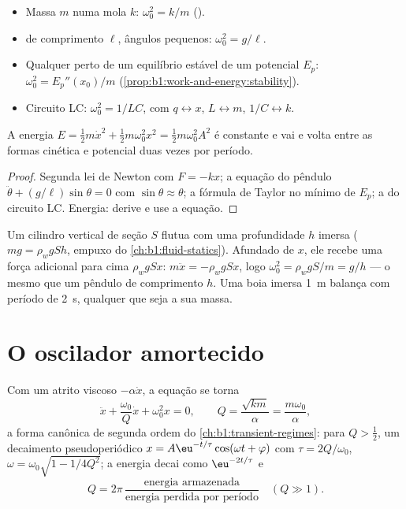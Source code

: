 \begin{proposition}\label{prop:b1:oscillators-resonance:sources}
\begin{itemize}
  \item Massa $m$ numa mola $k$: $\omega_0^2 = k/m$ ().
  \item {} de comprimento $\ell$, ângulos pequenos: $\omega_0^2 = g/\ell$.
  \item Qualquer  perto de um equilíbrio estável de um potencial $E_p$:
        $\omega_0^2 = E_p''(x_0)/m$ (\cref{prop:b1:work-and-energy:stability}).
  \item Circuito LC: $\omega_0^2 = 1/LC$, com $q \leftrightarrow x$,
        $L \leftrightarrow m$, $1/C \leftrightarrow k$.
\end{itemize}
A energia $E = \tfrac12 m\dot x^2 + \tfrac12 m\omega_0^2x^2 = \tfrac12
m\omega_0^2A^2$ é constante e vai e volta entre as formas cinética e
potencial duas vezes por período.
\end{proposition}

\begin{proof}
Segunda lei de Newton com $F = -kx$; a equação do pêndulo
$\ddot\theta + (g/\ell)\sin\theta = 0$ com $\sin\theta \approx \theta$;
a fórmula de Taylor no mínimo de $E_p$; a  do circuito
LC. Energia: derive e use a equação.
\end{proof}

\begin{example}\label{ex:b1:oscillators-resonance:bob}
Um cilindro vertical de seção $S$ flutua com uma profundidade $h$
imersa ($mg = \rho_wgSh$, empuxo do \cref{ch:b1:fluid-statics}).
Afundado de $x$, ele recebe uma força adicional para cima $\rho_wgSx$:
$m\ddot x = -\rho_wgSx$, logo $\omega_0^2 = \rho_wgS/m = g/h$ --- o mesmo
que um pêndulo de comprimento $h$. Uma boia imersa \qty{1}{m} balança com
período de \qty{2}{s}, qualquer que seja a sua massa.
\end{example}

\section{O oscilador amortecido}

\begin{proposition}\label{prop:b1:oscillators-resonance:damped}
Com um atrito viscoso $-\alpha\dot x$, a equação se torna
\[
\ddot x + \frac{\omega_0}{Q}\dot x + \omega_0^2x = 0, \qquad
Q = \frac{\sqrt{km}}{\alpha} = \frac{m\omega_0}{\alpha},
\]
a forma canônica de segunda ordem do \cref{ch:b1:transient-regimes}: para
$Q > \tfrac12$, um decaimento pseudoperiódico $x = A\eu^{-t/\tau}\cos(\omega t +
\varphi)$ com $\tau = 2Q/\omega_0$, $\omega = \omega_0\sqrt{1 - 1/4Q^2}$; a
energia decai como $\eu^{-2t/\tau}$ e
\[
Q = 2\pi\,\frac{\text{energia armazenada}}{\text{energia perdida por período}}
\quad (Q \gg 1) .
\]
\end{proposition}

